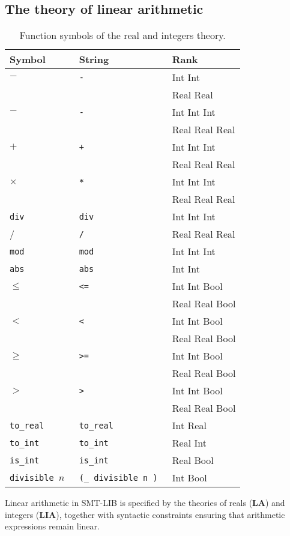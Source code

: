 \subsection{The theory of linear arithmetic}

\begin{table}
\centering
\begin{tabular}{lll}
\toprule
\textbf{Symbol} & \textbf{String} & \textbf{Rank} \\
\midrule
$-$ & \tt{-} & Int Int \\
    &            & Real Real \\
$-$ & \tt{-} & Int Int Int \\
    &            & Real Real Real \\
$+$ & \tt{+} & Int Int Int \\
    &            & Real Real Real \\
$\times$ & \tt{*} & Int Int Int \\
    &               & Real Real Real \\
\tt{div} & \tt{div} & Int Int Int \\
/ & \tt{/} & Real Real Real \\
\tt{mod} & \tt{mod} & Int Int Int \\
\tt{abs} & \tt{abs} & Int Int \\
$\leq$ & \tt{<=} & Int Int Bool \\
    &                & Real Real Bool \\
$<$ & \tt{<} & Int Int Bool \\
    &             & Real Real Bool \\
$\geq$ & \tt{>=} & Int Int Bool \\
    &               & Real Real Bool \\
$>$ & \tt{>} & Int Int Bool \\
    &             & Real Real Bool \\
\tt{to\_real} & \tt{to\_real} & Int Real \\
\tt{to\_int}  & \tt{to\_int} & Real Int \\
\tt{is\_int}  & \tt{is\_int} & Real Bool \\
\tt{divisible} $n$ & \tt{(\_ divisible n )} & Int Bool \\
\bottomrule
\end{tabular}
\caption{Function symbols of the real and integers theory.}
\label{tab:real-int-funs}
\end{table}

Linear arithmetic in SMT-LIB is specified by the theories of reals (\textbf{LA}) and integers (\textbf{LIA}), together with syntactic constraints ensuring that arithmetic expressions remain linear.

